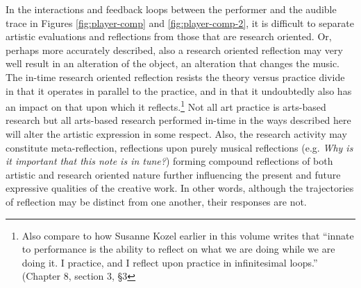 In the interactions and feedback loops between the performer and the audible trace in Figures \ref{fig:player-comp} and \ref{fig:player-comp-2}, it is difficult to separate artistic evaluations and reflections from those that are research oriented. Or, perhaps more accurately described, also a research oriented reflection may very well result in an alteration of the object, an alteration that changes the music. The in-time research oriented reflection resists the theory versus practice divide in that it operates in parallel to the practice, and in that it undoubtedly also has an impact on that upon which it reflects.\footnote{Also compare to how Susanne Kozel earlier in this volume writes that ``innate to performance is the ability to reflect on what we are doing while we are doing it. I practice, and I reflect upon practice in infinitesimal loops.'' (Chapter 8, section 3, \S3} Not all art practice is arts-based research but all arts-based research performed in-time in the ways described here will alter the artistic expression in some respect. Also, the research activity may constitute meta-reflection, reflections upon purely musical reflections (e.g. \emph{Why is it important that this note is in tune?}) forming compound reflections of both artistic and research oriented nature further influencing the present and future expressive qualities of the creative work. In other words, although the trajectories of reflection may be distinct from one another, their responses are not. 


